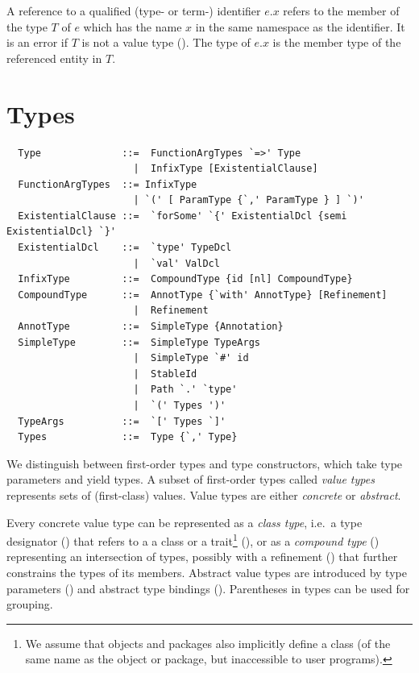 A reference to a qualified (type- or term-) identifier $e.x$ refers to
the member of the type $T$ of $e$ which has the name $x$ in the same
namespace as the identifier. It is an error if $T$ is not a value type
(). The type of $e.x$ is the member type of the
referenced entity in $T$.

\chapter{\label{sec:types}Types}

\syntax\begin{lstlisting}
  Type              ::=  FunctionArgTypes `=>' Type
                      |  InfixType [ExistentialClause]
  FunctionArgTypes  ::= InfixType
                      | `(' [ ParamType {`,' ParamType } ] `)'
  ExistentialClause ::=  `forSome' `{' ExistentialDcl {semi ExistentialDcl} `}'
  ExistentialDcl    ::=  `type' TypeDcl 
                      |  `val' ValDcl
  InfixType         ::=  CompoundType {id [nl] CompoundType}
  CompoundType      ::=  AnnotType {`with' AnnotType} [Refinement]
                      |  Refinement
  AnnotType         ::=  SimpleType {Annotation}
  SimpleType        ::=  SimpleType TypeArgs
                      |  SimpleType `#' id
                      |  StableId
                      |  Path `.' `type'
                      |  `(' Types ')'
  TypeArgs          ::=  `[' Types `]'
  Types             ::=  Type {`,' Type}
\end{lstlisting}

We distinguish between first-order types and type constructors, which
take type parameters and yield types. A subset of first-order types
called {\em value types} represents sets of (first-class) values.
Value types are either {\em concrete} or {\em abstract}. 

Every concrete value type can be represented as a {\em class type}, i.e.\ a
type designator () that refers to a
a class or a trait\footnote{We assume that objects and packages also implicitly
define a class (of the same name as the object or package, but
inaccessible to user programs).} (), or as a {\em
compound type} () representing an
intersection of types, possibly with a refinement
() that further constrains the types of its
members.
Abstract value types are introduced by type parameters () 
and abstract type bindings (). Parentheses in types can be used for
grouping.

